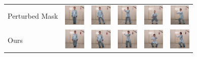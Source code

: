 \documentclass{article}
\begin{document}
\begin{table}[t]
\begin{center}
\begin{small}
\begin{sc}
\begin{tabular}{m{1.0cm}m{1.0cm}m{1.0cm}m{1.0cm}m{1.0cm}m{1.0cm}}
Perturbed Mask & \includegraphics[width=1cm,
height=1cm]{images/4_Perturbed_1} &
\includegraphics[width=1cm, height=1cm]{images/4_Perturbed_2} &
\includegraphics[width=1cm, height=1cm]{images/4_Perturbed_3} &
\includegraphics[width=1cm, height=1cm]{images/4_Perturbed_4} &
\includegraphics[width=1cm, height=1cm]{images/4_Perturbed_5} \\
Ours & \includegraphics[width=1cm, height=1cm]{images/5_Ours_1} &
\includegraphics[width=1cm, height=1cm]{images/5_Ours_2} &
\includegraphics[width=1cm, height=1cm]{images/5_Ours_3} &
\includegraphics[width=1cm, height=1cm]{images/5_Ours_4} &
\includegraphics[width=1cm, height=1cm]{images/5_Ours_5} \\
\bottomrule
\end{tabular}
\end{sc}
\end{small}
\end{center}
\vskip -0.1in
\end{table}
\end{document}
